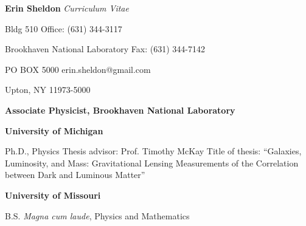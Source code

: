 \begin{center}
  {\LARGE {\bf Erin Sheldon}}
  {\large {\it Curriculum Vitae}}
\end{center}

%
%


\noindent
{Bldg 510} \hfill {Office: (631) 344-3117}

\noindent 
{Brookhaven National Laboratory} \hfill {Fax: (631) 344-7142}

\noindent
{PO BOX 5000} \hfill {erin.sheldon@gmail.com}

\noindent
{Upton, NY 11973-5000} %








\ssp
\ssp
\noindent
{}
{\bf Associate Physicist, Brookhaven National Laboratory}
\newline
\makebox[1.25in][l]{}{~~~~~~~~~~~~~~~~~~~~~~~~~~~~~}
	\hfill



\ssp
\ssp
\noindent
{}
{\bf University of Michigan}
\hfill
{}
\normalsize

\tsp
\noindent
\makebox[1.25in][l]{}
\parbox{5.40in}{
Ph.D., Physics\newline
Thesis advisor: Prof. Timothy McKay\newline
Title of thesis: ``Galaxies, Luminosity, and Mass: Gravitational Lensing Measurements of the Correlation between Dark and Luminous Matter''
}

\isp
\noindent
\makebox[1.25in][l]{}
{\bf University of Missouri}
\hfill
{}
\normalsize

\tsp
\noindent
\makebox[1.25in][l]{}
\parbox{5.40in}{B.S. {\it Magna cum laude}, Physics and Mathematics}

%
%

